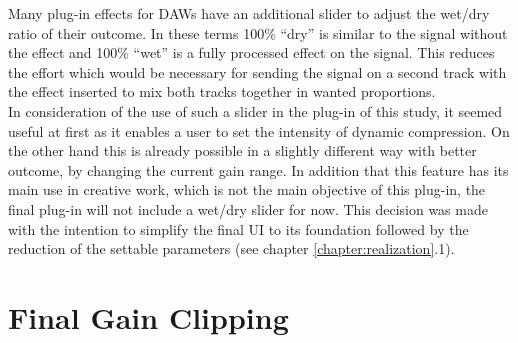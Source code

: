 Many plug-in effects for DAWs have an additional slider to adjust the wet/dry ratio of their outcome. In these terms 100\% “dry” is similar to the signal without the effect and 100\% “wet” is a fully processed effect on the signal. This reduces the effort which would be necessary for sending the signal on a second track with the effect inserted to mix both tracks together in wanted proportions.\\
In consideration of the use of such a slider in the plug-in of this study, it seemed useful at first as it enables a user to set the intensity of dynamic compression. On the other hand this is already possible in a slightly different way with better outcome, by changing the current gain range. In addition that this feature has its main use in creative work, which is not the main objective of this plug-in, the final plug-in will not include a wet/dry slider for now. This decision was made with the intention to simplify the final UI to its foundation followed by the reduction of the settable parameters (see chapter \ref{chapter:realization}.1).\\

\section{Final Gain Clipping}

